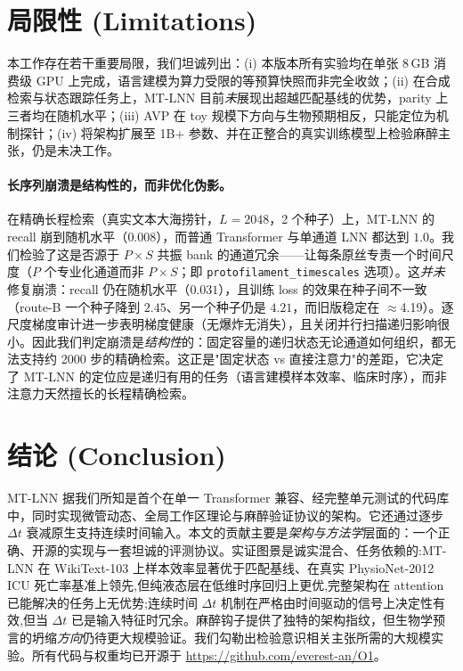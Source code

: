 \documentclass[11pt]{article}
\theoremstyle{definition}
\begin{document}
\section{局限性 (Limitations)}
\label{sec:limitations}

本工作存在若干重要局限，我们坦诚列出：(i) 本版本所有实验均在单张 8\,GB 消费级 GPU 上完成，语言建模为算力受限的等预算快照而非完全收敛；(ii) 在合成检索与状态跟踪任务上，MT-LNN 目前\emph{未}展现出超越匹配基线的优势，parity 上三者均在随机水平；(iii) AVP 在 toy 规模下方向与生物预期相反，只能定位为机制探针；(iv) 将架构扩展至 1B+ 参数、并在正整合的真实训练模型上检验麻醉主张，仍是未决工作。

\paragraph{长序列崩溃是结构性的，而非优化伪影。}
在精确长程检索（真实文本大海捞针，$L=2048$，2 个种子）上，MT-LNN 的 recall 崩到随机水平（$0.008$），而普通 Transformer 与单通道 LNN 都达到 $1.0$。我们检验了这是否源于 $P\times S$ 共振 bank 的通道冗余——让每条原丝专责一个时间尺度（$P$ 个专业化通道而非 $P\times S$；即 \texttt{protofilament\_timescales} 选项）。这\emph{并未}修复崩溃：recall 仍在随机水平（$0.031$），且训练 loss 的效果在种子间不一致（route-B 一个种子降到 $2.45$、另一个种子仍是 $4.21$，而旧版稳定在 $\approx$4.19）。逐尺度梯度审计进一步表明梯度健康（无爆炸无消失），且关闭并行扫描递归影响很小。因此我们判定崩溃是\emph{结构性}的：固定容量的递归状态无论通道如何组织，都无法支持约 2000 步的精确检索。这正是"固定状态 vs 直接注意力"的差距，它决定了 MT-LNN 的定位应是递归有用的任务（语言建模样本效率、临床时序），而非注意力天然擅长的长程精确检索。

\section{结论 (Conclusion)}
\label{sec:conclusion}
MT-LNN 据我们所知是首个在单一 Transformer 兼容、经完整单元测试的代码库中，同时实现微管动态、全局工作区理论与麻醉验证协议的架构。它还通过逐步 $\Delta t$ 衰减原生支持连续时间输入。本文的贡献主要是\emph{架构与方法学}层面的：一个正确、开源的实现与一套坦诚的评测协议。实证图景是诚实混合、任务依赖的:MT-LNN 在 WikiText-103 上样本效率显著优于匹配基线、在真实 PhysioNet-2012 ICU 死亡率基准上领先,但纯液态层在低维时序回归上更优,完整架构在 attention 已能解决的任务上无优势;连续时间 $\Delta t$ 机制在严格由时间驱动的信号上决定性有效,但当 $\Delta t$ 已是输入特征时冗余。麻醉钩子提供了独特的架构指纹，但生物学预言的坍缩\emph{方向}仍待更大规模验证。我们勾勒出检验意识相关主张所需的大规模实验。所有代码与权重均已开源于 \url{https://github.com/everest-an/O1}。
\end{document}
